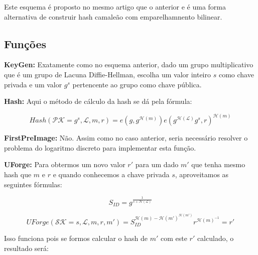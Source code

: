 \documentclass[a4paper]{article}
\begin{document}
Este esquema é proposto no mesmo artigo que o anterior e é uma forma
alternativa de construir hash camaleão com emparelhamnento bilinear.

\subsection{Funções}

\textbf{KeyGen: }Exatamente como no esquema anterior, dado um grupo
multiplicativo que é um grupo de Lacuna Diffie-Hellman, escolha um
valor inteiro $s$ como chave privada e um valor $g^s$ pertencente ao
grupo como chave pública.

\textbf{Hash: } Aqui o método de cálculo da hash se dá pela fórmula:

$$
Hash(\mathcal{PK}=g^s, \mathcal{L}, m, r) = e(g, g^{\mathcal{H}(m)})e(g^{\mathcal{H}(\mathcal{L})}g^s, r)^{\mathcal{H}(m)}
$$

\textbf{FirstPreImage:} Não. Assim como no caso anterior, seria
necessário resolver o problema do logaritmo discreto para implementar
esta função.

\textbf{UForge:} Para obtermos um novo valor $r'$ para um dado $m'$
que tenha mesmo hash que $m$ e $r$ e quando conhecemos a chave privada
$s$, aproveitamos as seguintes fórmulas:

$$
S_{ID} = g^{\frac{1}{s+\mathcal{H}(\mathcal{L})}}
$$

$$
UForge(\mathcal{SK}=s, \mathcal{L}, m, r, m') = S_{ID}^{\mathcal{H}(m)-\mathcal{H}(m')^{\mathcal{H}(m')}}r^{\mathcal{H}(m)^{-1}} = r'
$$

Isso funciona pois se formos calcular o hash de $m'$ com este $r'$
calculado, o resultado será:
\end{document}
